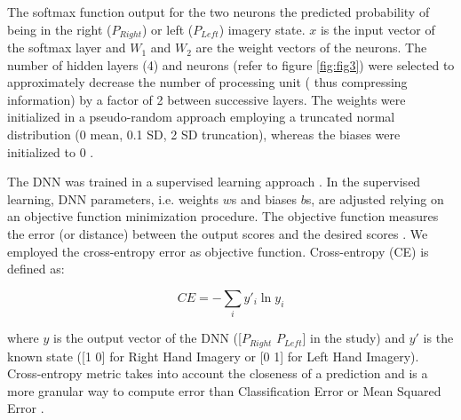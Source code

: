 \documentclass[12pt ]{iopart}
\begin{document}
The softmax function output for the two neurons  the predicted probability of being in the right ($P_{Right}$) or left ($P_{Left}$) imagery state. 
$x$ is the input vector of the softmax layer and $W_{1}$ and $W_{2}$ are the weight vectors of the neurons.
The number of hidden layers (4) and neurons (refer to figure \ref{fig:fig3}) were selected to approximately decrease the number of processing unit ( thus compressing information) by a factor of 2 between successive layers. 
The weights were initialized in a pseudo-random approach employing a truncated normal distribution (0 mean, 0.1 SD, 2 SD truncation), whereas the biases were initialized to 0 \parencite{sutskever2013importance}.

The DNN was trained in a supervised learning approach \parencite{hastie2009overview}.
In the supervised learning, DNN parameters, i.e. weights $w$s and biases $b$s, are adjusted relying on an objective function minimization procedure. The objective function measures the error (or distance) between the output scores and the desired scores . We employed the cross-entropy error as objective function.
Cross-entropy (CE) is defined as:

\begin{equation}
CE=
-\sum\limits_i y'_{i}\ln y_{i}
\end{equation}

where $y$ is the output vector of the DNN ([$P_{Right}$  $P_{Left}$] in the study) and $y'$ is the known state ([1 0] for Right Hand Imagery or [0 1] for Left Hand Imagery).
 Cross-entropy metric takes into account the closeness of a prediction and is a more granular way to compute error than Classification Error or Mean Squared Error \parencite{murphy2012machine}.
 
\end{document}
